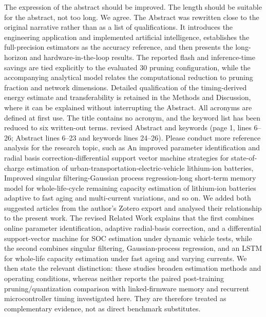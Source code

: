 {}
\markdownRendererSectionEnd \markdownRendererSectionBegin
{}\markdownRendererInterblockSeparator
{}\markdownRendererBlockQuoteBegin
The expression of the abstract should be improved. The length should be suitable for the abstract, not too long.\markdownRendererBlockQuoteEnd \markdownRendererInterblockSeparator
{} We agree. The Abstract was rewritten close to the original narrative rather than as a list of qualifications. It introduces the engineering application and implemented artificial intelligence, establishes the full-precision estimators as the accuracy reference, and then presents the long-horizon and hardware-in-the-loop results. The reported flash and inference-time savings are tied explicitly to the evaluated 30\markdownRendererPercentSign{} pruning configuration, while the accompanying analytical model relates the computational reduction to pruning fraction and network dimensions. Detailed qualification of the timing-derived energy estimate and transferability is retained in the Methods and Discussion, where it can be explained without interrupting the Abstract. All acronyms are defined at first use. The title contains no acronym, and the keyword list has been reduced to six written-out terms.\markdownRendererParagraphSeparator
{} revised Abstract and keywords (page 1, lines 6--26; Abstract lines 6--23 and keywords lines 24--26).\markdownRendererInterblockSeparator
{}
\markdownRendererSectionEnd \markdownRendererSectionBegin
{}\markdownRendererInterblockSeparator
{}\markdownRendererBlockQuoteBegin
Please conduct more reference analysis for the research topic, such as An improved parameter identification and radial basis correction-differential support vector machine strategies for state-of-charge estimation of urban-transportation-electric-vehicle lithium-ion batteries, Improved singular filtering-Gaussian process regression-long short-term memory model for whole-life-cycle remaining capacity estimation of lithium-ion batteries adaptive to fast aging and multi-current variations, and so on.\markdownRendererBlockQuoteEnd \markdownRendererInterblockSeparator
{} We added both suggested articles from the author's Zotero export and analysed their relationship to the present work. The revised Related Work explains that the first combines online parameter identification, adaptive radial-basis correction, and a differential support-vector machine for SOC estimation under dynamic vehicle tests, while the second combines singular filtering, Gaussian-process regression, and an LSTM for whole-life capacity estimation under fast ageing and varying currents. We then state the relevant distinction: these studies broaden estimation methods and operating conditions, whereas neither reports the paired post-training pruning/quantization comparison with linked-firmware memory and recurrent microcontroller timing investigated here. They are therefore treated as complementary evidence, not as direct benchmark substitutes.\markdownRendererParagraphSeparator

